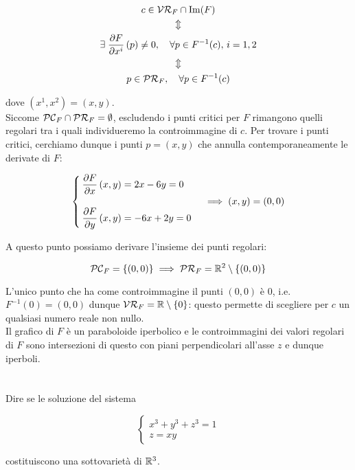 \begin{gather}
	c \in \VR_{F} \cap \Im(F) \nonumber\\
	\Updownarrow \nonumber\\
	\E \pdv{F}{x^{i}} \, (p) \neq 0 \qcomma \forall p \in F^{-1}(c), \, i=1,2\\
	\Updownarrow \nonumber\\
	p \in \PR_{F} \qcomma \forall p \in F^{-1}(c) \nonumber
\end{gather}

dove $ (x^{1},x^{2}) = (x,y) $.\\
Siccome $ \mathcal{PC}_{F} \cap \mathcal{PR}_{F} = \emptyset $, escludendo i punti critici per $ F $ rimangono quelli regolari tra i quali individueremo la controimmagine di $ c $. Per trovare i punti critici, cerchiamo dunque i punti $ p = (x,y) $ che annulla contemporaneamente le derivate di $ F $:

\begin{equation}
	\begin{cases}
		\dpdv{F}{x} \, (x,y) = 2 x - 6 y = 0\\\\
		\dpdv{F}{y} \, (x,y) = - 6 x + 2 y = 0
	\end{cases} %
	\implies %
	(x,y) = (0,0)
\end{equation}

A questo punto possiamo derivare l'insieme dei punti regolari:

\begin{equation}
	\PC_{F} = \{(0,0)\} %
	\implies %
	\PR_{F} = \R^{2} \setminus \{(0,0)\}
\end{equation}

L'unico punto che ha come controimmagine il punti $ (0,0) $ è $ 0 $, i.e. $ F^{-1}(0) = (0,0) $ dunque $ \mathcal{VR}_{F} = \mathbb{R} \setminus \{0\} $: questo permette di scegliere per $ c $ un qualsiasi numero reale non nullo.\\
Il grafico di $ F $ è un paraboloide iperbolico e le controimmagini dei valori regolari di $ F $ sono intersezioni di questo con piani perpendicolari all'asse $ z $ e dunque iperboli.

%

\newpage

%

\section{}\label{es2-14}

\begin{tcolorbox}
	Dire se le soluzione del sistema
	
	\begin{equation}
		\begin{cases}
			x^{3} + y^{3} + z^{3} = 1\\
			z = xy
		\end{cases}
	\end{equation}
	
	costituiscono una sottovarietà di $ \mathbb{R}^{3} $.
\end{tcolorbox}

